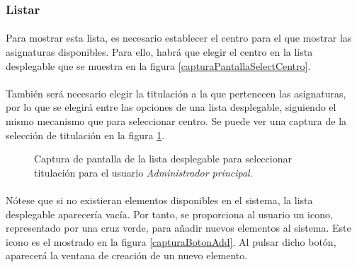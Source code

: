 \subsubsection{Listar}

  \paragraph{}Para mostrar esta lista, es necesario establecer el centro para
  el que mostrar las asignaturas disponibles. Para ello, habrá que elegir el
  centro en la lista desplegable que se muestra en la figura
  \ref{capturaPantallaSelectCentro}.

  \paragraph{}También será necesario elegir la titulación a la que pertenecen
  las asignaturas, por lo que se elegirá entre las opciones de una lista
  desplegable, siguiendo el mismo mecanismo que para seleccionar centro. Se
  puede ver una captura de la selección de titulación en la figura
  \ref{capturaPantallaSelectTitulacion}.

  \begin{figure}[!ht]
    \begin{center}
      \caption{Captura de pantalla de la lista desplegable para seleccionar titulación para el usuario \textit{Administrador principal}.}
      \label{capturaPantallaSelectTitulacion}
    \end{center}
  \end{figure}

  \paragraph{}Nótese que si no existieran elementos disponibles en el sistema,
  la lista desplegable aparecería vacía. Por tanto, se proporciona al usuario
  un icono, representado por una cruz verde, para añadir nuevos elementos al
  sistema. Este icono es el mostrado en la figura \ref{capturaBotonAdd}. Al
  pulsar dicho botón, aparecerá la ventana de creación de un nuevo elemento.


